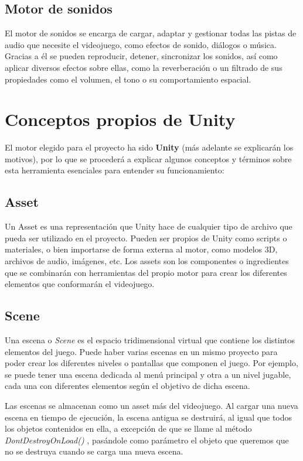 \subsection{Motor de sonidos}
El motor de sonidos se encarga de cargar, adaptar y gestionar todas las pistas de audio que necesite el videojuego, como efectos de sonido, diálogos o música. Gracias a él se pueden reproducir, detener, sincronizar los sonidos, así como aplicar diversos efectos sobre ellas, como la reverberación o un filtrado de sus propiedades como el volumen, el tono o su comportamiento espacial.

\section{Conceptos propios de Unity}
El motor elegido para el proyecto ha sido \textbf{Unity} (más adelante se explicarán los motivos), por lo que se procederá a explicar algunos conceptos y términos sobre esta herramienta esenciales para entender su funcionamiento:
\subsection{Asset}
Un Asset \cite{doc:Asset} es una representación que Unity hace de cualquier tipo de archivo que pueda ser utilizado en el proyecto. Pueden ser propios de Unity como scripts o materiales, o bien importarse de forma externa al motor, como modelos 3D, archivos de audio, imágenes, etc. Los assets son los componentes o ingredientes que se combinarán con herramientas del propio motor para crear los diferentes elementos que conformarán el videojuego.
\subsection{Scene}
Una escena o \textit{Scene} \cite{doc:Scene} es el  espacio tridimensional virtual que contiene los distintos elementos del juego. Puede haber varias escenas en un mismo proyecto para poder crear los diferentes niveles o pantallas que componen el juego. Por ejemplo, se puede tener una escena dedicada al menú principal y otra a un nivel jugable, cada una con diferentes elementos según el objetivo de dicha escena.

Las escenas se almacenan como un asset más del videojuego. Al cargar una nueva escena en tiempo de ejecución, la escena antigua se destruirá, al igual que todos los objetos contenidos en ella, a excepción de que se llame al método \textit{DontDestroyOnLoad()} \cite{doc:DontDestroyOnLoad}, pasándole como parámetro el objeto que queremos que no se destruya cuando se carga una nueva escena.
